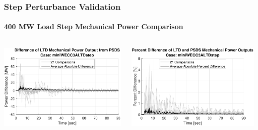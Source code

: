 \documentclass[14pt, unknownkeysallowed]{beamer}
\begin{document}
\begin{frame}
\frametitle{Step Perturbance Validation}
\framesubtitle{400 MW Load Step Mechanical Power Comparison}
\begin{columns}
	\begin{column}{.5\linewidth}
		\includegraphics[width=\linewidth]{miniWECC3ALTDstepPm2}
	\end{column}
	\begin{column}{.5\linewidth}
		\includegraphics[width=\linewidth]{miniWECC3ALTDstepPm3}
	\end{column}
\end{columns}
\end{frame}
\end{document}
